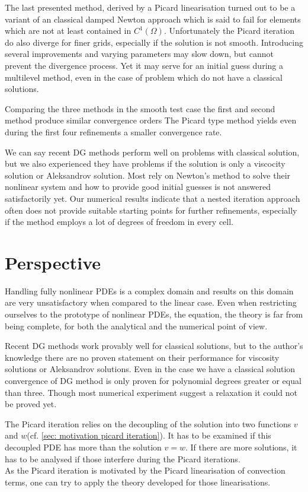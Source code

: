 The last presented method, derived by a Picard linearisation turned out to be a variant of an classical damped Newton approach which is said to fail for elements which are not at least contained in $C^1(\Omega)$.
Unfortunately the Picard iteration do also diverge for finer grids, especially if the solution is not smooth. Introducing several improvements and varying parameters may slow down, but cannot prevent the divergence process. Yet it may serve for an initial guess during a multilevel method, even in the case of problem which do not have a classical solutions.

Comparing the three methods in the smooth test case the first and second method produce similar convergence orders %
The Picard type method yields even during the first four refinements a smaller convergence rate. 

We can say recent DG methods perform well on problems with classical solution, but we also experienced they have problems if the \MA solution is only a viscocity solution or Aleksandrov solution. Most rely on Newton's method to solve their nonlinear system and how to provide good initial guesses is not answered satisfactorily yet.
Our numerical results indicate that a nested iteration approach often does not provide suitable starting points for further refinements, especially if the method employs a lot of degrees of freedom in every cell.

\section{Perspective}
Handling fully nonlinear PDEs is a complex domain and results on this domain are very unsatisfactory when compared to the linear case. Even when restricting ourselves to the prototype of nonlinear PDEs, the \MA equation, the theory is far from being complete, for both the analytical and the numerical point of view.

Recent DG methods work provably well for classical solutions, but to the author's knowledge there are no proven statement on their performance for viscosity solutions or Aleksandrov solutions. Even in the case we have a classical solution convergence of DG method is only proven for polynomial degrees greater or equal than three. Though most numerical experiment suggest a relaxation it could not be proved yet.

The Picard iteration relies on the decoupling of the solution into two functions $v$ and $w$(cf. \ref{sec: motivation picard iteration}). It has to be examined if this decoupled PDE has more than the solution $v=w$. If there are more solutions, it has to be analysed if those interfere during the Picard iterations. \\
As the Picard iteration is motivated by the Picard linearisation of convection terms, one can try to apply the theory developed for those linearisations.

